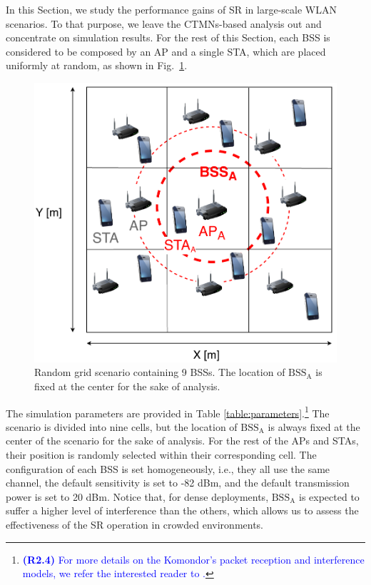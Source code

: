 \documentclass{ieeeaccess}
\begin{document}
In this Section, we study the performance gains of SR in large-scale WLAN scenarios. To that purpose, we leave the CTMNs-based analysis out and concentrate on simulation results. For the rest of this Section, each BSS is considered to be composed by an AP and a single STA, which are placed uniformly at random, as shown in Fig.~\ref{fig:random_scenario}. 

\begin{figure}[ht!]
	\centering
	\includegraphics[width=0.8\columnwidth]{random_scenario}
	\caption{Random grid scenario containing 9 BSSs. The location of $\text{BSS}_\text{A}$ is fixed at the center for the sake of analysis.}
	\label{fig:random_scenario}
\end{figure}

The simulation parameters are provided in Table \ref{table:parameters}.\footnote{\textcolor{blue}{\textbf{(R2.4)} For more details on the Komondor's packet reception and interference models, we refer the interested reader to \cite{barrachina2019komondor}.}} The scenario is divided into nine cells, but the location of $\text{BSS}_\text{A}$ is always fixed at the center of the scenario for the sake of analysis. For the rest of the APs and STAs, their position is randomly selected within their corresponding cell. The configuration of each BSS is set homogeneously, i.e., they all use the same channel, the default sensitivity is set to -82 dBm, and the default transmission power is set to 20 dBm. Notice that, for dense deployments, $\text{BSS}_\text{A}$ is expected to suffer a higher level of interference than the others, which allows us to assess the effectiveness of the SR operation in crowded environments.
\end{document}

